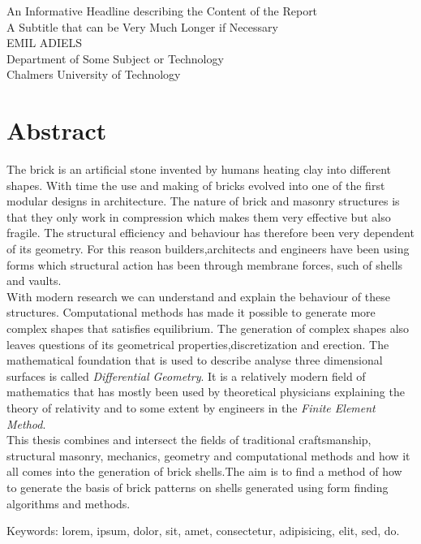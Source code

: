 An Informative Headline describing the Content of the Report\\
A Subtitle that can be Very Much Longer if Necessary\\
EMIL ADIELS\\
Department of Some Subject or Technology\\
Chalmers University of Technology \setlength{\parskip}{0.5cm}

\thispagestyle{plain}			%
\setlength{\parskip}{0pt plus 1.0pt}
\section*{Abstract}


The brick is an artificial stone invented by humans heating clay into different shapes. With time the use and making of bricks evolved into one of the first modular designs in architecture. The nature of brick and masonry structures is that they only work in compression which makes them very effective but also fragile. The structural efficiency and behaviour has therefore been very dependent of its geometry. For this reason builders,architects and engineers have been using forms which structural action has been through membrane forces, such of shells and vaults.\\

With modern research we can understand and explain the behaviour of these structures. Computational methods has made it possible to generate more complex shapes that satisfies equilibrium. The generation of complex shapes also leaves questions of its geometrical properties,discretization and erection. The mathematical foundation that is used to describe analyse three dimensional surfaces is called \textit{Differential Geometry}. It is a relatively modern field of mathematics that has mostly been used by theoretical physicians explaining the theory of relativity and to some extent by engineers in the \textit{Finite Element Method}.\\

This thesis combines and intersect the fields of traditional craftsmanship, structural masonry, mechanics, geometry and computational methods and how it all comes into the generation of brick shells.The aim is to find a method of how to generate the basis of brick patterns on shells generated using form finding algorithms and methods.    

\vfill
Keywords: lorem, ipsum, dolor, sit, amet, consectetur, adipisicing, elit, sed, do.

\newpage				%
\thispagestyle{empty}
\mbox{}